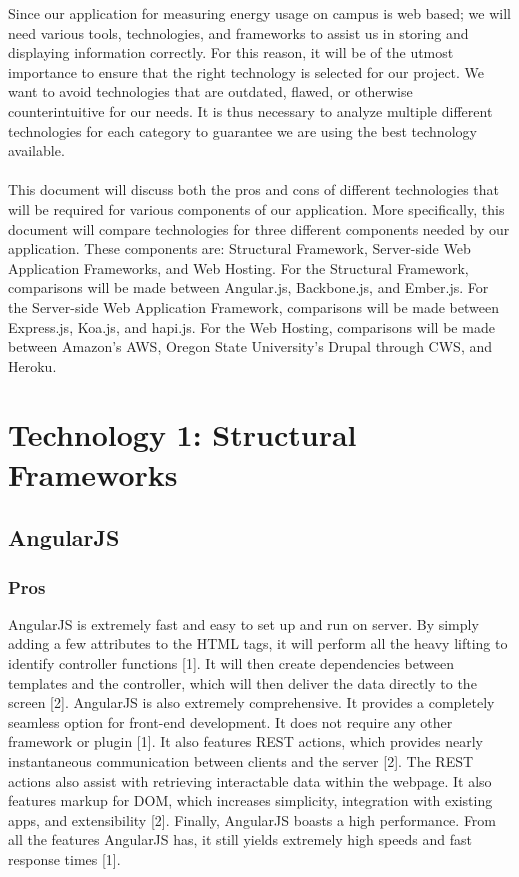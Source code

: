 \documentclass[onecolumn, draftclsnofoot,10pt, compsoc]{IEEEtran}
\begin{document}
	Since our application for measuring energy usage on campus is web based; we will need various tools, technologies, and frameworks to assist us in storing and displaying information correctly. For this reason, it will be of the utmost importance to ensure that the right technology is selected for our project. We want to avoid technologies that are outdated, flawed, or otherwise counterintuitive for our needs. It is thus necessary to analyze multiple different technologies for each category to guarantee we are using the best technology available.\\\\
This document will discuss both the pros and cons of different technologies that will be required for various components of our application. More specifically, this document will compare technologies for three different components needed by our application. These components are: Structural Framework, Server-side Web Application Frameworks, and Web Hosting. For the Structural Framework, comparisons will be made between Angular.js, Backbone.js, and Ember.js. For the Server-side Web Application Framework, comparisons will be made between Express.js, Koa.js, and hapi.js. For the Web Hosting, comparisons will be made between Amazon’s AWS, Oregon State University’s Drupal through CWS, and Heroku.



\section{Technology 1: Structural Frameworks}
	
	\subsection{AngularJS}
	\subsubsection{Pros}
		AngularJS is extremely fast and easy to set up and run on server. By simply adding a few attributes to the HTML tags, it will perform all the heavy lifting to identify controller functions [1]. It will then create dependencies between templates and the controller, which will then deliver the data directly to the screen [2]. AngularJS is also extremely comprehensive. It provides a completely seamless option for front-end development. It does not require any other framework or plugin [1]. It also features REST actions, which provides nearly instantaneous communication between clients and the server [2]. The REST actions also assist with retrieving interactable data within the webpage. It also features markup for DOM, which increases simplicity, integration with existing apps, and extensibility [2]. Finally, AngularJS boasts a high performance. From all the features AngularJS has, it still yields extremely high speeds and fast response times [1].
\end{document}

